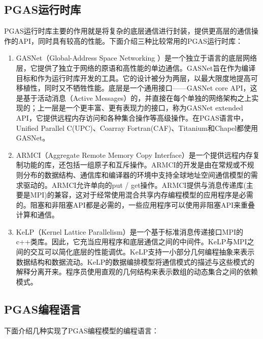 \subsection{PGAS运行时库}

PGAS运行时库主要的作用就是将复杂的底层通信进行封装，提供更高层的通信操作的API，同时具有较高的性能。下面介绍三种比较常用的PGAS运行时库：

\begin{enumerate}
	\item GASNet（Global-Address Space Networking ）是一个独立于语言的底层网络层，它提供了独立于网络的原语和高性能的单边通信\citep{gasnet}。GASNet旨在作为编译目标和作为运行时库开发的工具。它的设计被分为两层，以最大限度地提高可移植性，同时又不牺牲性能。底层是一个通用接口——GASNet core API，这是基于活动消息（Active Messages）\citep{mainwaring1995active}的，并直接在每个单独的网络架构之上实现的；上一层是一个更丰富、更有表现力的接口，称为GASNet extended API，它提供远程内存访问和各种集合操作等高级操作。在PGAS语言中，Unified Parallel C(UPC)、Coarray Fortran(CAF)、Titanium和Chapel都使用GASNet。
	\item ARMCI（Aggregate Remote Memory Copy Interface）是一个提供远程内存复制功能的库，还包括一组原子和互斥操作\citep{nieplocha1999armci}。ARMCI的开发是由在常规或不规则分布的数据结构、通信库和编译器的环境中支持全球地址空间通信模型的需求驱动的。ARMCI允许单向的put / get操作。ARMCI提供与消息传递库(主要是MPI)的兼容，这对于经常使用混合共享内存编程模型的应用程序是必需的。阻塞和非阻塞API都是必需的，一些应用程序可以使用非阻塞API来重叠计算和通信。
	\item KeLP（Kernel Lattice Parallelism）是一个基于标准消息传递接口MPI的c++类库\citep{kelp}。因此，它充当应用程序和底层通信之间的中间件。KeLP与MPI之间的交互可以简化底层的性能调优。KeLP支持一小部分几何编程抽象来表示数据结构和数据流动。KeLP的数据编排模型将通信模式的描述与这些模式的解释分离开来。程序员使用直观的几何结构来表示数组的动态集合之间的依赖模式\citep{fink1998efficient}。
\end{enumerate}

\subsection{PGAS编程语言}

下面介绍几种实现了PGAS编程模型的编程语言：

